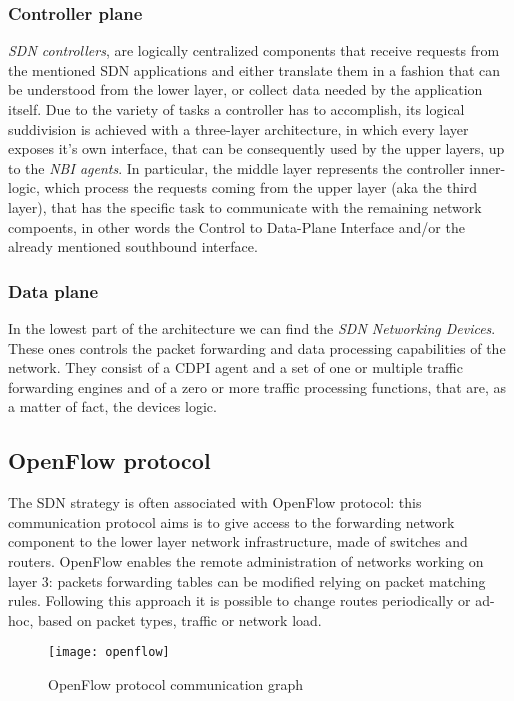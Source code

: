 \subsubsection{Controller plane}

\emph{SDN controllers}, are logically centralized components that
receive requests from the mentioned SDN applications and either translate them 
in a fashion that can be understood from the lower layer, or collect 
data needed by the application itself. 
Due to the variety of tasks a controller has to accomplish, its logical 
suddivision is achieved with a three-layer architecture, in which every layer 
exposes it's own interface, that can be consequently used by the upper 
layers, up to the \emph{NBI agents}.
In particular, the middle layer represents the controller inner-logic, which 
process the requests coming from the upper layer (aka the third layer), that 
has the specific task to communicate with the remaining network compoents, in 
other words the Control to Data-Plane Interface and/or the already 
mentioned southbound interface.

\subsubsection{Data plane}

In the lowest part of the architecture we can find the \emph{SDN Networking 
Devices}. These ones controls the packet forwarding and data processing 
capabilities of the network. They consist of a CDPI agent and a set of one or 
multiple traffic forwarding engines and of a zero or more traffic processing 
functions, that are, as a matter of fact, the devices logic.

\subsection{OpenFlow protocol}
The SDN strategy is often associated with OpenFlow protocol: this communication
protocol aims is to give access to the forwarding network component to the lower
layer network infrastructure, made of switches and routers. OpenFlow enables
the remote administration of networks working on layer 3: packets forwarding
tables can be modified relying on packet matching rules. Following this
approach it is possible to change routes periodically or ad-hoc, based on
packet types, traffic or network load.

\begin{figure}[t]
 \centering
 \texttt{[image: openflow]}
 \caption{OpenFlow protocol communication graph}
 \label{chap:background:img:openflow_protocol}
\end{figure}

